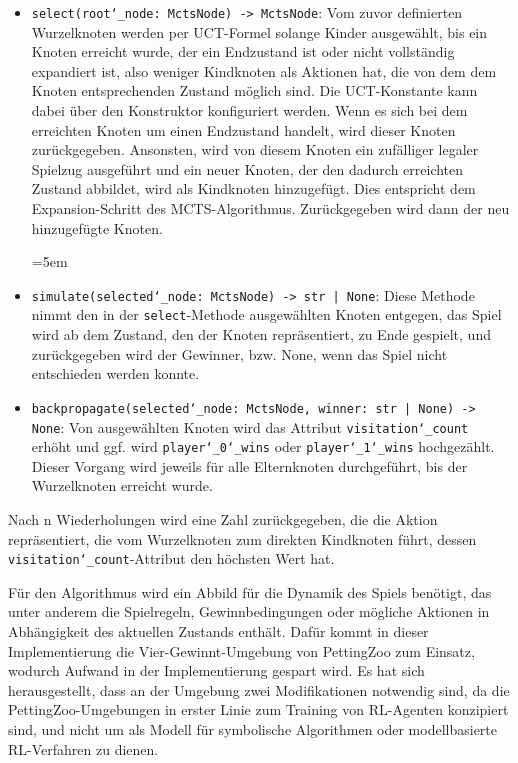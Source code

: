 \begin{itemize}
\item \texttt{select(root\char`_node: MctsNode) -> MctsNode}: Vom zuvor definierten Wurzelknoten werden per UCT-Formel solange Kinder ausgewählt, bis ein Knoten erreicht wurde, der ein Endzustand ist oder nicht vollständig expandiert ist, also weniger Kindknoten als Aktionen hat, die von dem dem Knoten entsprechenden Zustand möglich sind. Die UCT-Konstante kann dabei über den Konstruktor konfiguriert werden. Wenn es sich bei dem erreichten Knoten um einen Endzustand handelt, wird dieser Knoten zurückgegeben. Ansonsten, wird von diesem Knoten ein zufälliger legaler Spielzug ausgeführt und ein neuer Knoten, der den dadurch erreichten Zustand abbildet, wird als Kindknoten hinzugefügt. Dies entspricht dem Expansion-Schritt des MCTS-Algorithmus. Zurückgegeben wird dann der neu hinzugefügte Knoten.

\begingroup
\emergencystretch=5em
\item \texttt{simulate(selected\char`_node: MctsNode) -> str | None}: Diese Methode nimmt den in der \texttt{select}-Methode ausgewählten Knoten entgegen, das Spiel wird ab dem Zustand, den der Knoten repräsentiert, zu Ende gespielt, und zurückgegeben wird der Gewinner, bzw. None, wenn das Spiel nicht entschieden werden konnte.
\item \texttt{backpropagate(selected\char`_node: MctsNode, winner: str | None) -> None}: Von ausgewählten Knoten wird das Attribut \texttt{visitation\char`_count} erhöht und ggf. wird \texttt{player\char`_0\char`_wins} oder \texttt{player\char`_1\char`_wins} hochgezählt. Dieser Vorgang wird jeweils für alle Elternknoten durchgeführt, bis der Wurzelknoten erreicht wurde.

\endgroup
\end{itemize}

Nach n Wiederholungen wird eine Zahl zurückgegeben, die die Aktion repräsentiert, die vom Wurzelknoten zum direkten Kindknoten führt, dessen \texttt{visitation\char`_count}-At\-tribut den höchsten Wert hat.


Für den Algorithmus wird ein Abbild für die Dynamik des Spiels benötigt, das unter anderem die Spielregeln, Gewinnbedingungen oder mögliche Aktionen in Abhängigkeit des aktuellen Zustands enthält. Dafür kommt in dieser Implementierung die Vier-Gewinnt-Umgebung von PettingZoo zum Einsatz, wodurch Aufwand in der Implementierung gespart wird. Es hat sich herausgestellt, dass an der Umgebung zwei Modifikationen notwendig sind, da die PettingZoo-Umgebungen in erster Linie zum Training von RL-Agenten konzipiert sind, und nicht um als Modell für symbolische Algorithmen oder modellbasierte RL-Verfahren zu dienen.

